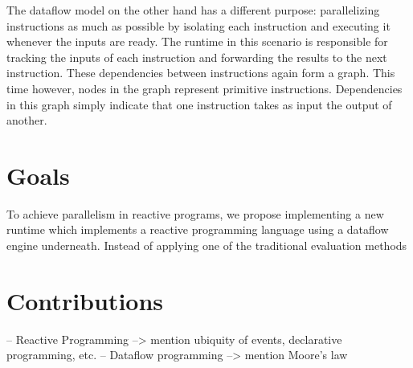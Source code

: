 The dataflow model on the other hand has a different purpose: parallelizing instructions as much as possible by isolating each instruction and executing it whenever the inputs are ready. The runtime in this scenario is responsible for tracking the inputs of each instruction and forwarding the results to the next instruction. These dependencies between instructions again form a graph. This time however, nodes in the graph represent primitive instructions. Dependencies in this graph simply indicate that one instruction takes as input the output of another. 

\section{Goals}

To achieve parallelism in reactive programs, we propose implementing a new runtime which implements a reactive programming language using a dataflow engine underneath. Instead of applying one of the traditional evaluation methods 

\section{Contributions}


-- Reactive Programming --> mention ubiquity of events, declarative programming, etc.
-- Dataflow programming --> mention Moore's law
